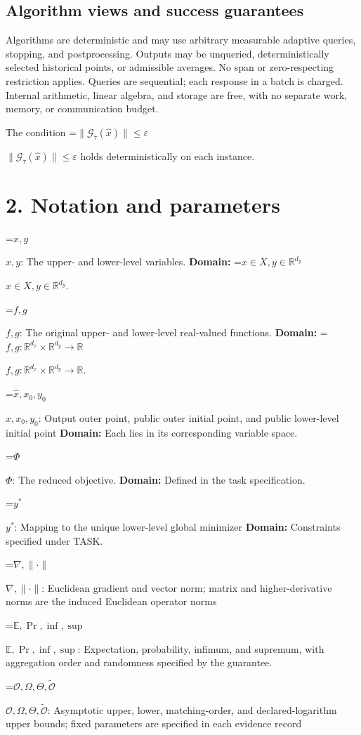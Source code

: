 \documentclass[10pt,a4paper]{article}
\newcommand{\AtlasMath}[1]{\par\begingroup\centering\setbox0=\hbox{$\displaystyle #1$}\ifdim\wd0>1.4\linewidth\typeout{ATLAS WIDE FORMULA: \the\wd0}\fi\ifdim\wd0>\linewidth\resizebox{\linewidth}{!}{\box0}\else\box0\fi\par\endgroup}
\newcommand{\AtlasInlineMath}[1]{\begingroup\setbox0=\hbox{$#1$}\ifdim\wd0>.4\linewidth\endgroup\AtlasMath{#1}\else\endgroup$#1$\fi}
\begin{document}
\subsection{Algorithm views and success guarantees}
Algorithms are deterministic and may use arbitrary measurable adaptive queries, stopping, and postprocessing. Outputs may be unqueried, deterministically selected historical points, or admissible averages. No span or zero-respecting restriction applies. Queries are sequential; each response in a batch is charged. Internal arithmetic, linear algebra, and storage are free, with no separate work, memory, or communication budget.

The condition \AtlasInlineMath{\|\mathcal{G}_\tau(\widehat{x})\|\le\varepsilon} holds deterministically on each instance.

\section{2. Notation and parameters}
\AtlasInlineMath{x,y}: The upper- and lower-level variables. \textbf{Domain:} \AtlasInlineMath{x\in X,y\in\mathbb R^{d_y}}.

\AtlasInlineMath{f,g}: The original upper- and lower-level real-valued functions. \textbf{Domain:} \AtlasInlineMath{f,g:\mathbb R^{d_x}\times\mathbb R^{d_y}\to\mathbb R}.

\AtlasInlineMath{\widehat x,x_0,y_0}: Output outer point, public outer initial point, and public lower-level initial point \textbf{Domain:} Each lies in its corresponding variable space.

\AtlasInlineMath{\Phi}: The reduced objective. \textbf{Domain:} Defined in the task specification.

\AtlasInlineMath{y^*}: Mapping to the unique lower-level global minimizer \textbf{Domain:} Constraints specified under TASK.

\AtlasInlineMath{\nabla,\|\cdot\|}: Euclidean gradient and vector norm; matrix and higher-derivative norms are the induced Euclidean operator norms

\AtlasInlineMath{\mathbb E,\Pr,\inf,\sup}: Expectation, probability, infimum, and supremum, with aggregation order and randomness specified by the guarantee.

\AtlasInlineMath{\mathcal O,\Omega,\Theta,\widetilde{\mathcal O}}: Asymptotic upper, lower, matching-order, and declared-logarithm upper bounds; fixed parameters are specified in each evidence record
\end{document}
